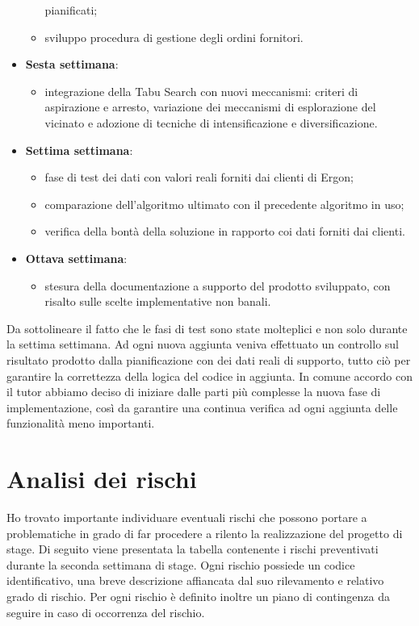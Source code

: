 \begin{itemize}
\begin{itemize}
		pianificati;
			\item sviluppo procedura di gestione degli ordini fornitori.
		\end{itemize}
	\item \textbf{Sesta settimana}:
		\begin{itemize}
		\item integrazione della Tabu Search con nuovi meccanismi:
		criteri di aspirazione e arresto, variazione dei
		meccanismi di esplorazione del vicinato e adozione di
		tecniche di intensificazione e diversificazione.
		\end{itemize}
	\item \textbf{Settima settimana}:
		\begin{itemize}
		\item fase di test dei dati con valori reali forniti dai clienti di Ergon;
		\item comparazione dell'algoritmo ultimato con il precedente algoritmo in uso;
		\item verifica della bontà della soluzione in rapporto coi dati forniti dai clienti.
		\end{itemize}
	\item \textbf{Ottava settimana}:
		\begin{itemize}
		\item stesura della documentazione a supporto del prodotto sviluppato, con risalto sulle scelte implementative non banali.
		\end{itemize}
\end{itemize}

Da sottolineare il fatto che le fasi di test sono state molteplici e non solo durante la settima settimana. Ad ogni nuova aggiunta veniva effettuato un controllo sul risultato prodotto dalla pianificazione con dei dati reali di supporto, tutto ciò per garantire la correttezza della logica del codice in aggiunta. In comune accordo con il tutor abbiamo deciso di iniziare dalle parti più complesse la nuova fase di implementazione, così da garantire una continua verifica ad ogni aggiunta delle funzionalità meno importanti.

\pagebreak
\section{Analisi dei rischi}
Ho trovato importante individuare eventuali rischi che possono portare a problematiche in grado di far procedere a rilento la realizzazione del progetto di stage.
Di seguito viene presentata la tabella contenente i rischi preventivati durante la seconda settimana di stage. Ogni rischio possiede un codice identificativo, una breve descrizione affiancata dal suo rilevamento e relativo grado di rischio. Per ogni rischio è definito inoltre un piano di contingenza da seguire in caso di occorrenza del rischio.



